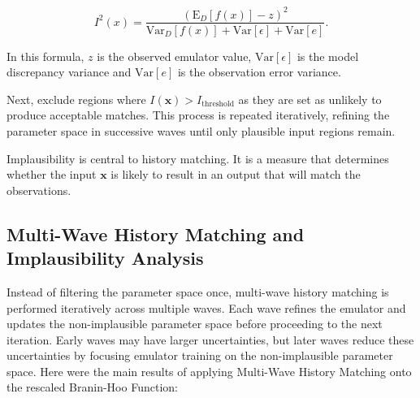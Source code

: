 \documentclass[12pt]{report} %
\begin{document}
\begin{equation*}
    I^2 (x) = \frac{\left(\text{E}_D[f(x)] - z \right)^2}{\text{Var}_D[f(x)] + \text{Var}[\epsilon] + \text{Var}[e]}. 
\end{equation*}
    
\noindent In this formula, $z$ is the observed emulator value, $\text{Var}[\epsilon]$ is the model discrepancy variance and $\text{Var}[e]$ is the observation error variance.

Next, exclude regions where \( I(\mathbf{x}) > I_{\text{threshold}} \) as they are set as unlikely to produce acceptable matches. This process is repeated iteratively, refining the parameter space in successive waves until only plausible input regions remain.\cite{andrianakis2015bayesian} 

Implausibility is central to history matching. It is a measure that determines whether the input $\mathbf{x}$ is likely to result in an output that will match the observations.\cite{andrianakis2015bayesian}

\subsection{Multi-Wave History Matching and Implausibility Analysis}
Instead of filtering the parameter space once, multi-wave history matching is performed iteratively across multiple waves. Each wave refines the emulator and updates the non-implausible parameter space before proceeding to the next iteration.\cite{salter2016comparison} Early waves may have larger uncertainties, but later waves reduce these uncertainties by focusing emulator training on the non-implausible parameter space.\cite{salter2016comparison} Here were the main results of applying Multi-Wave History Matching onto the rescaled Branin-Hoo Function:
\end{document}
